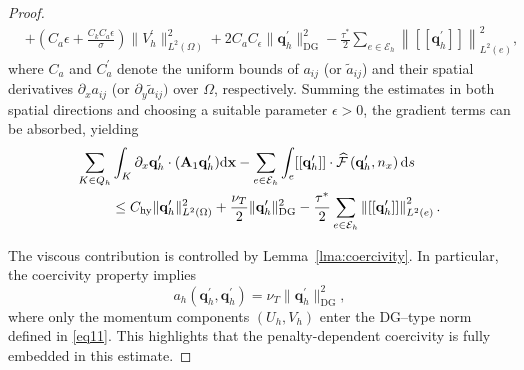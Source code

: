 \documentclass[pdflatex,sn-mathphys-num]{sn-jnl}%
\theoremstyle{thmstyleone}%
\theoremstyle{thmstyletwo}%
\theoremstyle{thmstylethree}%
\begin{document}
\begin{proof}
\begin{equation*}
\begin{aligned}
&+\left( C_a \epsilon + \frac{C_k C_a\epsilon}{\sigma} \right) \|V_{h}^{\prime}\|_{L^2(\Omega)}^2 + 2C_a C_\epsilon \|\mathbf{q}_h^{\prime}\|_{\mathrm{DG}}^2 -
\frac{\tau^*}{2}\sum_{e \in \mathcal{E}_h}
\left\| [[\mathbf{q}_h^{\prime}]] \right\|^2_{L^2(e)},
\end{aligned}
\end{equation*}
where $C_{a}$ and $C_a^{\prime}$ denote the uniform bounds of $a_{ij}$ (or $\tilde{a}_{ij}$) and their spatial derivatives $\partial_x a_{ij}$ (or $\partial_y \tilde{a}_{ij})$ over $\Omega$, respectively. Summing the estimates in both spatial directions and choosing a suitable parameter $\epsilon>0$, the gradient terms can be absorbed, yielding
\begin{equation}\notag
\begin{aligned}
    \sum_{K \in Q_h} & \int_K \partial_x\mathbf{q}_h^{\prime} \cdot (\mathbf{A}_1\mathbf{q}_h^{\prime}) \mathrm{d} \mathbf{x} -\sum_{e \in \mathcal{E}_h} \int_e  [[\mathbf{q}_h^\prime]]\cdot \widehat{\mathcal{F}}\left(\mathbf{q}_h^{\prime},n_x\right) \mathrm{d} s \\
                     &\le C_{\mathrm{hy}} \|\mathbf{q}_{h}^{\prime}\|_{L^2(\Omega)}^2 + \frac{\nu_T}{2} \|\mathbf{q}_h^{\prime}\|_{\mathrm{DG}}^2  -
\frac{\tau^*}{2}\sum_{e \in \mathcal{E}_h}
\left\| [[\mathbf{q}_h^{\prime}]] \right\|^2_{L^2(e)}.
\end{aligned}
\end{equation}


The viscous contribution is controlled by Lemma~\ref{lma:coercivity}. In particular, the coercivity property implies
\[
a_h(\mathbf{q}_h^{\prime},\mathbf{q}_h^{\prime})= \nu_T\|\mathbf{q}_h^{\prime}\|_{\mathrm{DG}}^2,
\]
where only the momentum components $(U_h,V_h)$ enter the DG--type norm defined in \eqref{eq11}. This highlights that the penalty-dependent coercivity is fully embedded in this estimate.


\end{proof}
\end{document}
